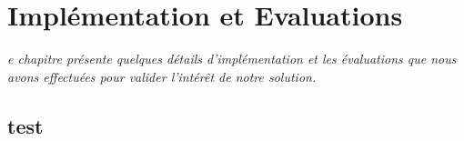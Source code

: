 \let\textcircled=\pgftextcircled
\chapter{Implémentation et Evaluations}
\label{chap:contrib}

\textit{e chapitre présente quelques détails d’implémentation et les évaluations que nous avons effectuées pour valider l’intérêt de notre solution.}

\minitoc

\newpage  
\section{test}